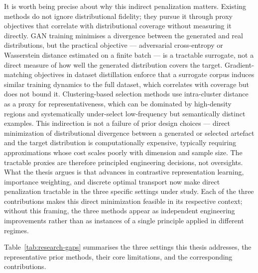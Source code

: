\begin{foldable}
  It is worth being precise about why this indirect penalization matters.
  Existing methods do not ignore distributional fidelity; they pursue it through proxy objectives that correlate with distributional coverage without measuring it directly.
  \ac{GAN} training minimises a divergence between the generated and real distributions, but the practical objective --- adversarial cross-entropy or Wasserstein distance estimated on a finite batch --- is a tractable surrogate, not a direct measure of how well the generated distribution covers the target.
  Gradient-matching objectives in dataset distillation enforce that a surrogate corpus induces similar training dynamics to the full dataset, which correlates with coverage but does not bound it.
  Clustering-based selection methods use intra-cluster distance as a proxy for representativeness, which can be dominated by high-density regions and systematically under-select low-frequency but semantically distinct examples.
  This indirection is not a failure of prior design choices --- direct minimization of distributional divergence between a generated or selected artefact and the target distribution is computationally expensive, typically requiring approximations whose cost scales poorly with dimension and sample size.
  The tractable proxies are therefore principled engineering decisions, not oversights.
  What the thesis argues is that advances in contrastive representation learning, importance weighting, and discrete optimal transport now make direct penalization tractable in the three specific settings under study.
  Each of the three contributions makes this direct minimization feasible in its respective context; without this framing, the three methods appear as independent engineering improvements rather than as instances of a single principle applied in different regimes.
\end{foldable}

\begin{foldable}
  Table~\ref{tab:research-gaps} summarises the three settings this thesis addresses, the representative prior methods, their core limitations, and the corresponding contributions.
\end{foldable}

